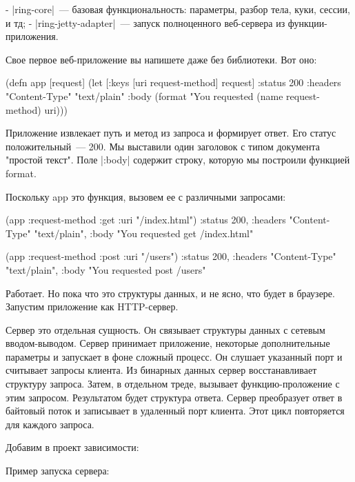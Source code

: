 - \spverb|ring-core|~--- базовая функциональность: параметры, разбор тела, куки, сессии,
  и тд;
- \spverb|ring-jetty-adapter|~--- запуск полноценного веб-сервера из функции-приложения.

Свое первое веб-приложение вы напишете даже без библиотеки. Вот оно:

\begin{code}
(defn app
  [request]
  (let [{:keys [uri request-method]} request]
    {:status 200
     :headers {"Content-Type" "text/plain"}
     :body (format "You requested %
                   (name request-method)
                   uri)}))
\end{code}

Приложение извлекает путь и метод из запроса и формирует ответ. Его статус
положительный~--- 200. Мы выставили один заголовок с типом документа "простой
текст". Поле \spverb|:body| содержит строку, которую мы построили функцией format.

Поскольку app это функция, вызовем ее с различными запросами:

\begin{code}
(app {:request-method :get :uri "/index.html"})
{:status 200,
 :headers {"Content-Type" "text/plain"},
 :body "You requested get /index.html"}

(app {:request-method :post :uri "/users"})
{:status 200,
 :headers {"Content-Type" "text/plain"},
 :body "You requested post /users"}
\end{code}

Работает. Но пока что это структуры данных, и не ясно, что будет в
браузере. Запустим приложение как HTTP-сервер.

Сервер это отдельная сущность. Он связывает структуры данных с сетевым
вводом-выводом. Сервер принимает приложение, некоторые дополнительные параметры
и запускает в фоне сложный процесс. Он слушает указанный порт и считывает
запросы клиента. Из бинарных данных сервер восстанавливает структуру
запроса. Затем, в отдельном треде, вызывает функцию-проложение с этим
запросом. Результатом будет структура ответа. Сервер преобразует ответ в
байтовый поток и записывает в удаленный порт клиента. Этот цикл повторяется для
каждого запроса.

Добавим в проект зависимости:

\begin{code}
\end{code}

Пример запуска сервера:


